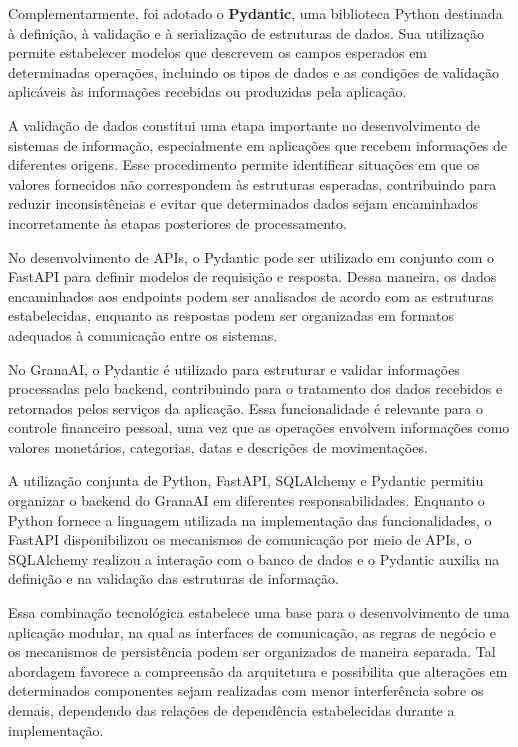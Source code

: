Complementarmente, foi adotado o \textbf{Pydantic}, uma biblioteca Python destinada à definição, à validação e à serialização de estruturas de dados. Sua utilização permite estabelecer modelos que descrevem os campos esperados em determinadas operações, incluindo os tipos de dados e as condições de validação aplicáveis às informações recebidas ou produzidas pela aplicação.

A validação de dados constitui uma etapa importante no desenvolvimento de sistemas de informação, especialmente em aplicações que recebem informações de diferentes origens. Esse procedimento permite identificar situações em que os valores fornecidos não correspondem às estruturas esperadas, contribuindo para reduzir inconsistências e evitar que determinados dados sejam encaminhados incorretamente às etapas posteriores de processamento.

No desenvolvimento de APIs, o Pydantic pode ser utilizado em conjunto com o FastAPI para definir modelos de requisição e resposta. Dessa maneira, os dados encaminhados aos endpoints podem ser analisados de acordo com as estruturas estabelecidas, enquanto as respostas podem ser organizadas em formatos adequados à comunicação entre os sistemas.

No GranaAI, o Pydantic é utilizado para estruturar e validar informações processadas pelo backend, contribuindo para o tratamento dos dados recebidos e retornados pelos serviços da aplicação. Essa funcionalidade é relevante para o controle financeiro pessoal, uma vez que as operações envolvem informações como valores monetários, categorias, datas e descrições de movimentações.

A utilização conjunta de Python, FastAPI, SQLAlchemy e Pydantic permitiu organizar o backend do GranaAI em diferentes responsabilidades. Enquanto o Python fornece a linguagem utilizada na implementação das funcionalidades, o FastAPI disponibilizou os mecanismos de comunicação por meio de APIs, o SQLAlchemy realizou a interação com o banco de dados e o Pydantic auxilia na definição e na validação das estruturas de informação.

Essa combinação tecnológica estabelece uma base para o desenvolvimento de uma aplicação modular, na qual as interfaces de comunicação, as regras de negócio e os mecanismos de persistência podem ser organizados de maneira separada. Tal abordagem favorece a compreensão da arquitetura e possibilita que alterações em determinados componentes sejam realizadas com menor interferência sobre os demais, dependendo das relações de dependência estabelecidas durante a implementação.

